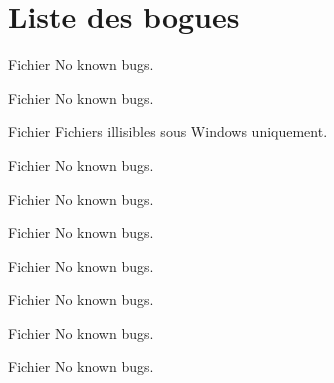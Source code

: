 \chapter{Liste des bogues}
\hypertarget{bug}{}\label{bug}

\begin{DoxyRefList}
\item[Fichier \doxylink{aes_8c}{aes.c} ]\label{bug__bug000001}%
%
No known bugs.  
\item[Fichier \doxylink{aes_8h}{aes.h} ]\label{bug__bug000002}%
%
No known bugs.  
\item[Fichier \doxylink{bitmap_8c}{bitmap.c} ]\label{bug__bug000003}%
%
Fichiers illisibles sous Windows uniquement.  
\item[Fichier \doxylink{cipher_8c}{cipher.c} ]\label{bug__bug000004}%
%
No known bugs.  
\item[Fichier \doxylink{cipher_8h}{cipher.h} ]\label{bug__bug000005}%
%
No known bugs.  
\item[Fichier \doxylink{entropie_8c}{entropie.c} ]\label{bug__bug000006}%
%
No known bugs.  
\item[Fichier \doxylink{entropie_8h}{entropie.h} ]\label{bug__bug000007}%
%
No known bugs.  
\item[Fichier \doxylink{tests_8c}{tests.c} ]\label{bug__bug000008}%
%
No known bugs.  
\item[Fichier \doxylink{tools_8c}{tools.c} ]\label{bug__bug000009}%
%
No known bugs.  
\item[Fichier \doxylink{tools_8h}{tools.h} ]\label{bug__bug000010}%
%
No known bugs. 
\end{DoxyRefList}